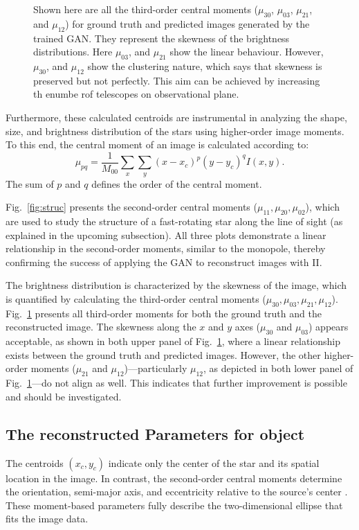 \begin{figure}
  \caption{Shown here are all the third-order central moments ($\mu_{30}$, $\mu_{03}$, $\mu_{21}$, and $\mu_{12}$) for ground truth and predicted images generated by the trained GAN. They represent the skewness of the brightness distributions. Here $\mu_{03}$, and $\mu_{21}$ show the linear behaviour. However, $\mu_{30}$, and $\mu_{12}$ show the clustering nature, which says that skewness is preserved but not perfectly. This aim can be achieved by increasing th enumbe rof telescopes on observational plane.}
  \label{fig:moments}
\end{figure}
Furthermore, these calculated centroids are instrumental in analyzing the shape, size, and brightness distribution of the stars using higher-order image moments. To this end, the central moment of an image is calculated according to:
\begin{equation}
	\mu_{pq} = \frac{1}{M_{00}}\sum_{x} \sum_{y} (x - x_c)^p (y - y_c)^q I(x, y).
\end{equation}
The sum of \(p\) and \(q\) defines the order of the central moment. 

Fig.~\ref{fig:struc} presents the second-order central moments (\(\mu_{11}, \mu_{20}, \mu_{02}\)), which are used to study the structure of a fast-rotating star along the line of sight (as explained in the upcoming subsection). All three plots demonstrate a linear relationship in the second-order moments, similar to the monopole, thereby confirming the success of applying the GAN to reconstruct images with II.

The brightness distribution is characterized by the skewness of the image, which is quantified by calculating the third-order central moments (\(\mu_{30}, \mu_{03}, \mu_{21}, \mu_{12}\)). Fig.~\ref{fig:moments} presents all third-order moments for both the ground truth and the reconstructed image. The skewness along the $x$ and $y$ axes (\(\mu_{30}\) and \(\mu_{03}\)) appears acceptable, as shown in both upper panel of Fig.~\ref{fig:moments}, where a linear relationship exists between the ground truth and predicted images. However, the other higher-order moments (\(\mu_{21}\) and \(\mu_{12}\))—particularly \(\mu_{12}\), as depicted in both lower panel of Fig.~\ref{fig:moments}—do not align as well. This indicates that further improvement is possible and should be investigated.

\subsection{The reconstructed Parameters for object}
The centroids \((x_c, y_c)\) indicate only the center of the star and its spatial location in the image. In contrast, the second-order central moments determine the orientation, semi-major axis, and eccentricity relative to the source's center \citep{teague1980image}. These moment-based parameters fully describe the two-dimensional ellipse that fits the image data.

